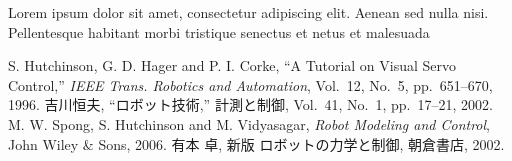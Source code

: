 \documentclass[a4j,9pt,twoside,twocolumn]{jsarticle}
\begin{document}
Lorem ipsum dolor sit amet, consectetur adipiscing elit. Aenean sed
nulla nisi. Pellentesque habitant morbi tristique senectus et netus et malesuada

\begin{thebibliography}{99}
S. Hutchinson, G. D. Hager and P. I. Corke,
``A Tutorial on Visual Servo Control,''
{\it IEEE Trans. Robotics and Automation},
Vol.~12, No.~5, pp.~651--670, 1996.
%
吉川恒夫,
``ロボット技術,''
計測と制御, Vol.~41, No.~1, pp.~17--21, 2002.
%
M. W. Spong, S. Hutchinson and M. Vidyasagar, 
{\it Robot Modeling and Control}, 
John Wiley \& Sons, 2006. 
%
有本 卓, 新版 ロボットの力学と制御, 朝倉書店, 2002. 
\end{thebibliography}
\end{document}

